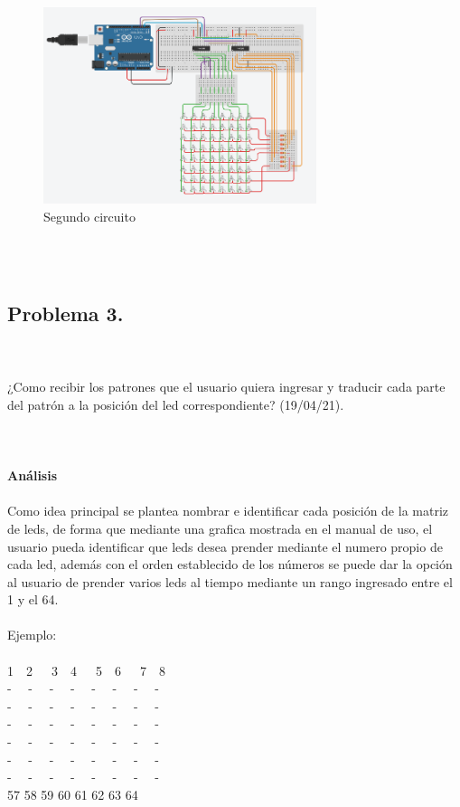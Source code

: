 \documentclass{article}
\begin{document}
\begin{figure}[h]
    \includegraphics[width=8cm]{Imagen2.png}
    \centering
    \caption{Segundo circuito}
    \label{fig:Imagen2}
\end{figure}\\\\

\subsection{\large Problema 3.}\\\\
¿Como recibir los patrones que el usuario quiera ingresar y traducir cada parte del patrón a la posición del led correspondiente? (19/04/21).\\
\\\\\
\\

\textbf{\large Análisis}\\\\
Como idea principal se plantea nombrar e identificar cada posición de la matriz de leds, de forma que mediante una grafica mostrada en el manual de uso, el usuario pueda identificar que leds desea prender mediante el numero propio de cada led, además con el orden establecido de los números se puede dar la opción al usuario de prender varios leds al tiempo mediante un rango ingresado entre el 1 y el 64.
\\
\\
Ejemplo:
\\
\\
1\  \ 2\ \ \ 3\  \ 4\ \ \ 5\  \ 6\ \ \ 7\  \ 8\\ 
- \  \  - \  \ - \  \ - \  \ - \  \ - \  \ - \   \ -\\
- \  \  - \  \ - \  \ - \  \ - \  \ - \  \ - \   \ -\\
- \  \  - \  \ - \  \ - \  \ - \  \ - \  \ - \   \ -\\
- \  \  - \  \ - \  \ - \  \ - \  \ - \  \ - \   \ -\\
- \  \  - \  \ - \  \ - \  \ - \  \ - \  \ - \   \ -\\
- \  \  - \  \ - \  \ - \  \ - \  \ - \  \ - \   \ -\\
57 58 59 60 61 62 63 64\\
\end{document}
